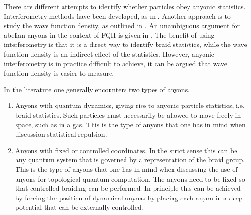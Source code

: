 There are different attempts to identify whether particles obey anyonic statistics. Interferometry methods have been developed, as in \cite{bonderson}. Another approach is to study the wave function density, as outlined in \cite{lundholm-rougerie,fractional angular momentum}. An unambiguous argument for abelian anyons in the context of FQH is given in \cite{lundholm-rougerie}. The benefit of using interferometry is that it is a direct way to identify braid statistics, while the wave function density is an indirect effect of the statistics. However, anyonic interferometry is in practice difficult to achieve, it can be argued that wave function density is easier to measure.

In the literature one generally encounters two types of anyons.
\begin{enumerate}
  \item Anyons with quantum dynamics, giving rise to anyonic particle statistics, i.e. braid statistics. Such particles must necessarily be allowed to move freely in space, such as in a gas. This is the type of anyons that one has in mind when discussion statistical repulsion.
  \item Anyons with fixed or controlled coordinates. In the strict sense this can be any quantum system that is governed by a representation of the braid group. This is the type of anyons that one has in mind when discussing the use of anyons for topological quantum computation. The anyons need to be fixed so that controlled braiding can be performed. In principle this can be achieved by forcing the position of dynamical anyons by placing each anyon in a deep potential that can be externally controlled.
\end{enumerate}
